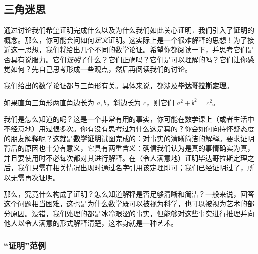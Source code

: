\subsection{三角迷思}\label{sec:section1.1.1}

通过讨论我们希望证明完成什么以及为什么我们如此关心证明，我们引入了\textbf{证明}的概念。那么，你可能会问如何\emph{定义}证明。这实际上是一个很难解释的思想！为了接近这一思想，我们将给出几个不同的数学论证。希望你都阅读一下，并思考它们是否具有说服力。它们\emph{证明}了什么？它们正确吗？它们是可以理解的吗？它们让你感觉如何？先自己思考形成一些观点，然后再阅读我们的讨论。

我们给出的数学论证都与三角形有关。具体来说，都涉及\textbf{毕达哥拉斯定理}。

\begin{theorem}[毕达哥拉斯定理] \label{thm:pythagorean}
    如果直角三角形两直角边长为 $a,b$，斜边长为 $c$，则它们 $a^2+b^2=c^2$。
\end{theorem}

\begin{center}
\end{center}

我们是怎么知道的呢？这是一个非常有用的事实，你可能在数学课上（或者生活中不经意地）用过很多次。你有没有思考过为什么这是真的？你会如何向持怀疑态度的朋友解释呢？这就是\textbf{数学证明}试图完成的：对事实的清晰简洁的解释。要求证明背后的原因也十分有意义，它具有两重含义：确信我们认为是真的事情确实为真，并且要使用时不必每次都对其进行解释。在（令人满意地）证明毕达哥拉斯定理之后，我们只需在相关情况出现时通过名字引用该定理即可；我们已经证明过了，所以无需再次证明。

那么，究竟什么构成了证明？怎么知道解释是否足够清晰和简洁？一般来说，回答这个问题相当困难，这也是为什么数学既可以被视为科学，也可以被视为艺术的部分原因。没错，我们处理的都是冰冷艰涩的事实，但能够对这些事实进行推理并向他人以令人满意的形式解释清楚，这本身就是一种艺术。

\subsubsection*{``证明''范例}

